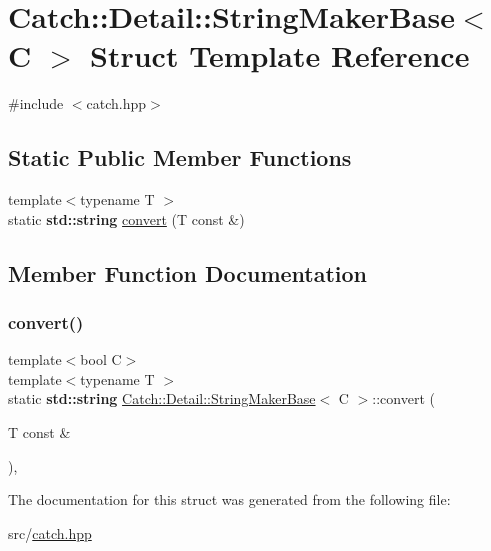 \hypertarget{struct_catch_1_1_detail_1_1_string_maker_base}{}\section{Catch\+:\+:Detail\+:\+:String\+Maker\+Base$<$ C $>$ Struct Template Reference}
\label{struct_catch_1_1_detail_1_1_string_maker_base}


{\ttfamily \#include $<$catch.\+hpp$>$}

\subsection*{Static Public Member Functions}
\begin{DoxyCompactItemize}
\item 
{\footnotesize template$<$typename T $>$ }\\static \textbf{ std\+::string} \hyperlink{struct_catch_1_1_detail_1_1_string_maker_base_a8eb9f635dc413a5758e22614bafaf1a3}{convert} (T const \&)
\end{DoxyCompactItemize}


\subsection{Member Function Documentation}
\mbox{\label{struct_catch_1_1_detail_1_1_string_maker_base_a8eb9f635dc413a5758e22614bafaf1a3}} 
\subsubsection{\texorpdfstring{convert()}{convert()}}
{\footnotesize\ttfamily template$<$bool C$>$ \\
template$<$typename T $>$ \\
static \textbf{ std\+::string} \hyperlink{struct_catch_1_1_detail_1_1_string_maker_base}{Catch\+::\+Detail\+::\+String\+Maker\+Base}$<$ C $>$\+::convert (\begin{DoxyParamCaption}\item[{T const \&}]{ }\end{DoxyParamCaption})\hspace{0.3cm}{\ttfamily [inline]}, {\ttfamily [static]}}



The documentation for this struct was generated from the following file\+:\begin{DoxyCompactItemize}
\item 
src/\hyperlink{catch_8hpp}{catch.\+hpp}\end{DoxyCompactItemize}
